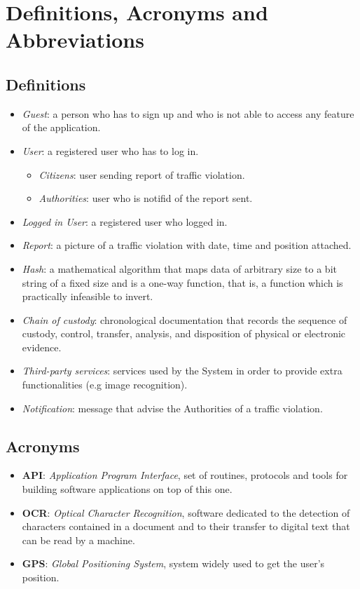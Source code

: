 \documentclass{report}
\begin{document}
  
	
\section{Definitions, Acronyms and Abbreviations}
\subsection{Definitions}
\begin{itemize}
    \item \textit{Guest}: a person who has to sign up and who is not able to access any feature of the application.
    \item \textit{User}: a registered user who has to log in.
	\begin{itemize}
		\item \textit{Citizens}: user sending report of traffic violation.
		\item \textit{Authorities}: user who is notifid of the report sent. 
	\end{itemize} 
    \item \textit{Logged in User}: a registered user who logged in.
    \item \textit{Report}: a picture of a traffic violation with date, time and position attached.
    \item \textit{Hash}: a mathematical algorithm that maps data of arbitrary size to a bit string of a fixed size and is a one-way function, that is, a function which is practically infeasible to invert.
    \item \textit{Chain of custody}: chronological documentation that records the sequence of custody, control, transfer, analysis, and disposition of physical or electronic evidence.
    \item \textit{Third-party services}: services used by the System in order to provide extra functionalities (e.g image recognition).
    \item \textit{Notification}: message that advise the Authorities of a traffic violation.
\end{itemize}
 \subsection{Acronyms}
 \begin{itemize}
 \item \textbf{API}: \textit{Application Program Interface}, set of routines, protocols and tools for building software applications on top of this one.
 \item \textbf{OCR}: \textit{Optical Character Recognition}, software dedicated to the detection of characters contained in a document and to their transfer to digital text that can be read by a machine. 
 \item \textbf{GPS}: \textit{Global Positioning System}, system widely used to get the user's position.
 \end{itemize}
\end{document}
